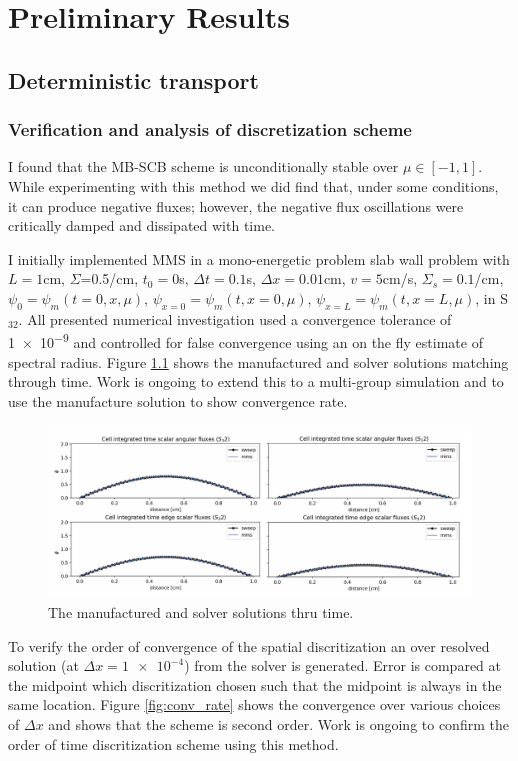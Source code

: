 \chapter{Preliminary Results}
\label{ch:results}

\section{Deterministic transport}

\subsection{Verification and analysis of discretization scheme}

I found that the MB-SCB scheme is unconditionally stable over $\mu \in [-1, 1]$. While experimenting with this method we did find that, under some conditions, it can produce negative fluxes; however, the negative flux oscillations were critically damped and dissipated with time.

I initially implemented MMS in a mono-energetic problem slab wall problem with $L=1$cm, $\Sigma$=0.5/cm, $t_0=0$s, $\Delta t = 0.1$s, $\Delta x=0.01$cm, $v=5$cm/s, $\Sigma_s=0.1$/cm, $\psi_0=\psi_m(t=0,x,\mu)$, $\psi_{x=0}=\psi_m(t,x=0,\mu)$, $\psi_{x=L}=\psi_m(t,x=L,\mu)$, in S$_{32}$.
All presented numerical investigation used a convergence tolerance of \num{1e-9} and controlled for false convergence using an on the fly estimate of spectral radius.
Figure \ref{fig:mms_sol} shows the manufactured and solver solutions matching through time.
Work is ongoing to extend this to a multi-group simulation and to use the manufacture solution to show convergence rate.


\begin{figure}[h!]
    \centering
    \includegraphics[width=.75\textwidth]{figures/results/mms_sol.png}
    \caption{The manufactured and solver solutions thru time.}
    \label{fig:mms_sol}
\end{figure}

To verify the order of convergence of the spatial discritization an over resolved solution (at $\Delta x=\num{1e-4}$) from the solver is generated.
Error is compared at the midpoint which discritization chosen such that the midpoint is always in the same location.
Figure \ref{fig:conv_rate} shows the convergence over various choices of $\Delta x$ and shows that the scheme is second order.
Work is ongoing to confirm the order of time discritization scheme using this method.

